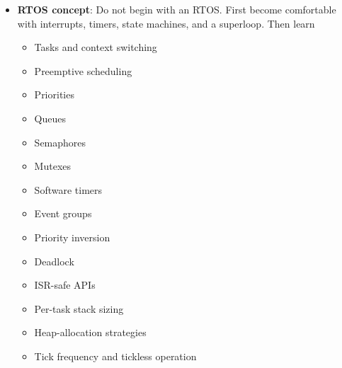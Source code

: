 \documentclass{report}
\begin{document}
\begin{itemize}
\begin{itemize}
                \item Device drivers
                \item Board support code
                \item MCU peripheral access
                \item Vendor HAL or low-level libraries
            \end{itemize}
            Also understand:
            \begin{itemize}
                \item Hardware abstraction layers
                \item Dependency injection through function pointers
                \item State machines
                \item Event queues
                \item Error reporting
                \item Timeouts
                \item Configuration versus runtime state
                \item Interfaces suitable for host-based testing
            \end{itemize}
        \item \textbf{RTOS concept}: Do not begin with an RTOS. First become comfortable with interrupts, timers, state machines, and a superloop. Then learn
            \begin{itemize}
                \item Tasks and context switching
                \item Preemptive scheduling
                \item Priorities
                \item Queues
                \item Semaphores
                \item Mutexes
                \item Software timers
                \item Event groups
                \item Priority inversion
                \item Deadlock
                \item ISR-safe APIs
                \item Per-task stack sizing
                \item Heap-allocation strategies
                \item Tick frequency and tickless operation

\end{itemize}
\end{itemize}
\end{document}

